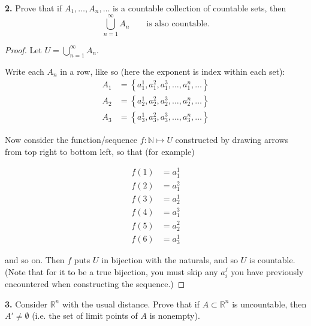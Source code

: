 \documentclass{article}
\newcommand{\R}{\mathbb{R}}
\newcommand{\N}{\mathbb{N}}
\newcommand{\set}[1]{\left\{ #1 \right\}}
\begin{document}
\newpage %


\textbf{2. }  %
Prove that if $A_1, \dots, A_n, \dots$ is a countable collection of countable sets, then
$$\bigcup_{n = 1}^{\infty} A_n \qquad \text{is also countable.}$$

\begin{proof}

    Let $\displaystyle U = \bigcup_{n = 1}^\infty A_n$.
    
    Write each $A_n$ in a row, like so (here the exponent is index within each set):
    \begin{align*}
        A_1 &= \set{a_1^1, a_1^2, a_1^3, \dots, a_1^n, \dots} \\
        A_2 &= \set{a_2^1, a_2^2, a_2^3, \dots, a_2^n, \dots} \\
        A_3 &= \set{a_3^1, a_3^2, a_3^3, \dots, a_3^n, \dots}
    \end{align*}
    
    Now consider the function/sequence $f: \N \mapsto U$ constructed by drawing arrows from top right to bottom left, so that (for example)
    
    \begin{align*}
        f(1) &= a_1^1 \\
        f(2) &= a_1^2 \\
        f(3) &= a_2^1 \\
        f(4) &= a_1^3 \\
        f(5) &= a_2^2 \\
        f(6) &= a_3^1
    \end{align*}
    
    and so on. Then $f$ puts $U$ in bijection with the naturals, and so $U$ is countable. (Note that for it to be a true bijection, you must skip any $a_i^j$ you have previously encountered when constructing the sequence.)
\end{proof}



\newpage %


\textbf{3. } %
Consider $\R^n$ with the usual distance. Prove that if $A \subset
\R^n$ is uncountable, then $A' \ne \emptyset$ (i.e. the set of limit points of $A$ is nonempty).
\end{document}
